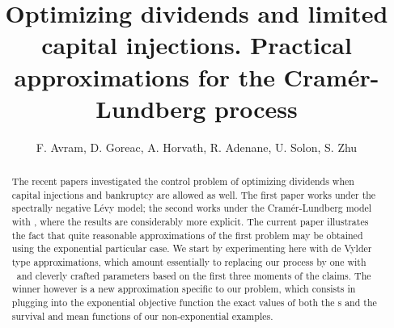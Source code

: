 \documentclass[10pt,a4paper]{article}
\def\CL{Cram\`er-Lundberg } \def\WH{Wiener-Hopf } \def\iof{l^{-1}(a)}
\def\how{however } \def\How{However, } \def\H{\widehat }
\begin{document}
\title{Optimizing dividends and limited capital injections. Practical approximations for the  Cram\'er-Lundberg process
}
\author{F. Avram, D. Goreac, A. Horvath, R. Adenane, U. Solon, S. Zhu
}
\maketitle
\begin{abstract}
The recent papers \cite{Gaj,AGLW}
 investigated  the  control problem  of  optimizing dividends
 when capital injections and bankruptcy are allowed as well. The first paper works under the  spectrally negative L\'evy model; the second works under the  Cramér-Lundberg model  with \expoj,  where the results are considerably more explicit.  The current paper illustrates the fact that quite reasonable approximations of the first problem may be obtained using the exponential particular case. We start by experimenting here with de Vylder type approximations, which amount essentially to replacing our process by one with \expoj\ and cleverly crafted parameters based on the first three moments of the claims. The winner \how is a new approximation specific to our problem, which consists in plugging into the exponential objective function   the exact values of  both  the \sf s and the survival and mean functions of our non-exponential examples.
\end{abstract}
\tableofcontents











% 

%
%
%

%

%
%
%

%

%
%
\small

%

%
\end{document}
